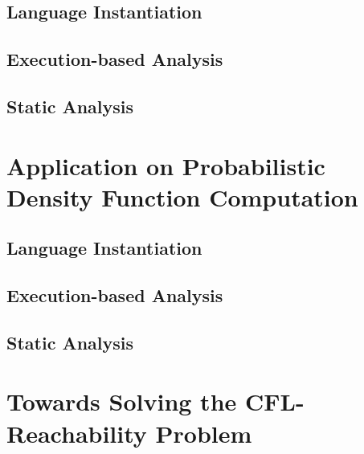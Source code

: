 \documentclass[a4paper,11pt]{article}
\begin{document}
\subsection{Language Instantiation}
\subsection{Execution-based Analysis}
\subsection{Static Analysis}
% 

\section{Application on Probabilistic Density Function Computation}
\label{sec:furthers}
\subsection{Language Instantiation}
\subsection{Execution-based Analysis}
\subsection{Static Analysis}

\section{Towards Solving the CFL-Reachability Problem}
\label{sec:cfl_reduction}

\end{document}
